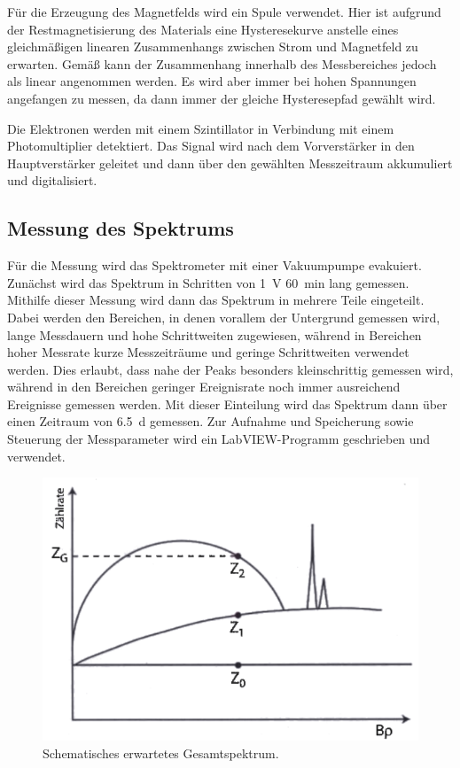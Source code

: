 \documentclass[
	a4paper,
	12pt,
	pagesize,
	ngerman
]{scrartcl}
\begin{document}
	Für die Erzeugung des Magnetfelds wird ein Spule verwendet.
	Hier ist aufgrund der Restmagnetisierung des Materials eine Hysteresekurve anstelle eines gleichmäßigen linearen Zusammenhangs zwischen Strom und Magnetfeld zu erwarten.
	Gemäß \cite{Anleitung} kann der Zusammenhang innerhalb des Messbereiches jedoch als linear angenommen werden.
	Es wird aber immer bei hohen Spannungen angefangen zu messen, da dann immer der gleiche Hysteresepfad gewählt wird.

	Die Elektronen werden mit einem Szintillator in Verbindung mit einem Photomultiplier detektiert.
	Das Signal wird nach dem Vorverstärker in den Hauptverstärker geleitet und dann über den gewählten Messzeitraum akkumuliert und digitalisiert.

	\subsection{Messung des Spektrums}

	Für die Messung wird das Spektrometer mit einer Vakuumpumpe evakuiert.
	Zunächst wird das Spektrum in Schritten von \SI{1}{V} \SI{60}{\minute} lang gemessen.
	Mithilfe dieser Messung wird dann das Spektrum in mehrere Teile eingeteilt.
	Dabei werden den Bereichen, in denen vorallem der Untergrund gemessen wird, lange Messdauern und hohe Schrittweiten zugewiesen, während in Bereichen hoher Messrate kurze Messzeiträume und geringe Schrittweiten verwendet werden.
	Dies erlaubt, dass nahe der Peaks besonders kleinschrittig gemessen wird, während in den Bereichen geringer Ereignisrate noch immer ausreichend Ereignisse gemessen werden.
	Mit dieser Einteilung wird das Spektrum dann über einen Zeitraum von \SI{6,5}{\day} gemessen.
	Zur Aufnahme und Speicherung sowie Steuerung der Messparameter wird ein LabVIEW-Programm geschrieben und verwendet.

	\begin{figure}[H]
			\includegraphics[width= 0.6 \linewidth]{img/Schema_Spektrum}
			\caption{
			Schematisches erwartetes Gesamtspektrum.
			\cite{Anleitung}
			}
			\label{fig_Schema_Spektrum}
	\end{figure}
\end{document}

